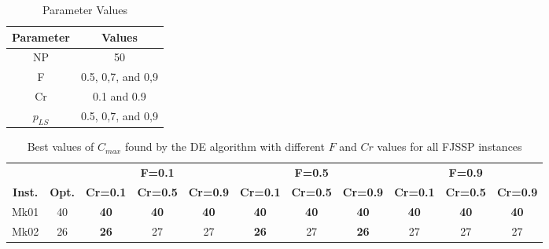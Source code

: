 \begin{table}[tb]
\scriptsize
\centering
\caption{Parameter Values}
\begin{tabular}{cc}
\hline
\multicolumn{1}{c}{Parameter} & \multicolumn{1}{c}{Values} \\ 
\hline
NP                              & 50                          \\
F                               & 0.5, 0,7, and 0,9           \\
Cr                              & 0.1 and 0.9                 \\
$p_{LS}$                          & 0.5, 0,7, and 0,9          \\
\hline
\end{tabular}
\label{tab:parameteres}
\end{table}
%
\begin{table*}[!tb]
    \scriptsize
  \centering
  \caption{Best values of $ C_{max} $ found by the DE algorithm with different $F$ and $Cr$ values for all FJSSP instances}
    \begin{tabular}{rrccccccccc|}
    \hline
\multicolumn{1}{|c|}{} & \multicolumn{1}{c|}{} & \multicolumn{3}{c|}{\textbf{F=0.1}} & 
\multicolumn{3}{c|}{\textbf{F=0.5}} & 
\multicolumn{3}{c|}{\textbf{F=0.9}}  \bigstrut\\
    \cline{3-11}
    \multicolumn{1}{|c|}{{\textbf{Inst.}}} & \multicolumn{1}{c|}{{\textbf{Opt.}}} & \multicolumn{1}{c|}{\textbf{Cr=0.1}} & \multicolumn{1}{c|}{\textbf{Cr=0.5}} & \multicolumn{1}{c|}{\textbf{Cr=0.9}} & \multicolumn{1}{c|}{\textbf{Cr=0.1}} & \multicolumn{1}{c|}{\textbf{Cr=0.5}} & \multicolumn{1}{c|}{\textbf{Cr=0.9}} & \multicolumn{1}{c|}{\textbf{Cr=0.1}} & \multicolumn{1}{c|}{\textbf{Cr=0.5}} & \multicolumn{1}{c|}{\textbf{Cr=0.9}} \bigstrut\\
    \hline
    \multicolumn{1}{|c|}{Mk01} & \multicolumn{1}{c|}{40} & \multicolumn{1}{c|}{\textbf{40}} & \multicolumn{1}{c|}{\textbf{40}} & \multicolumn{1}{c|}{\textbf{40}} & \multicolumn{1}{c|}{\textbf{40}} & \multicolumn{1}{c|}{\textbf{40}} & \multicolumn{1}{c|}{\textbf{40}} & \multicolumn{1}{c|}{\textbf{40}} & \multicolumn{1}{c|}{\textbf{40}} & \textbf{40} \bigstrut\\
    \multicolumn{1}{|c|}{Mk02} & \multicolumn{1}{c|}{26} & \multicolumn{1}{c|}{\textbf{26}} & \multicolumn{1}{c|}{27} & \multicolumn{1}{c|}{27} & \multicolumn{1}{c|}{\textbf{26}} & \multicolumn{1}{c|}{27} & \multicolumn{1}{c|}{\textbf{26}} & \multicolumn{1}{c|}{27} & \multicolumn{1}{c|}{27} & 27 \bigstrut\\

\end{tabular}
\end{table*}

